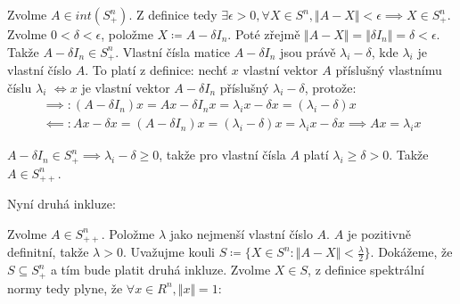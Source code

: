 \documentclass[12pt, a4paper]{article}
\begin{document}
Zvolme $A \in int(S^n_+)$. Z definice tedy  $\exists \epsilon > 0, \forall X \in S^n, \Vert A-X \Vert < \epsilon \implies X \in S^n_+$. Zvolme $0 < \delta < \epsilon$, položme $X \coloneqq  A - \delta I_n$. Poté zřejmě $\Vert A - X \Vert = \Vert \delta I_n \Vert = \delta < \epsilon$. Takže $A-\delta I_n \in S^n_+$. Vlastní čísla matice $A-\delta I_n$ jsou právě $\lambda_i - \delta$, kde $\lambda_i$ je vlastní číslo $A$. To platí z definice: nechť $x$ vlastní vektor $A$ příslušný vlastnímu číslu $\lambda_i$ $\iff x$ je vlastní vektor $A-\delta I_n$ příslušný $\lambda_i - \delta$, protože:
\begin{gather*}
\implies: (A-\delta I_n)x = Ax - \delta I_n x = \lambda_i x - \delta x = (\lambda_i -\delta) x\\
\impliedby: Ax - \delta x = (A-\delta I_n)x = (\lambda_i - \delta)x = \lambda_i x - \delta x \implies Ax = \lambda_i x
\end{gather*}

$A-\delta I_n \in S^n_+ \implies \lambda_i-\delta \geq 0$, takže pro vlastní čísla $A$ platí $\lambda_i \geq \delta > 0$. Takže $A \in S^n_{++}$.

Nyní druhá inkluze:

Zvolme $A \in S^n_{++}$. Položme $\lambda$ jako nejmenší vlastní číslo $A$. $A$ je pozitivně definitní, takže $\lambda > 0$. Uvažujme kouli $S \coloneqq \{ X \in S^n: \Vert A-X \Vert < \frac{\lambda}{2}\}$. Dokážeme, že $S \subseteq S^n_+$ a tím bude platit druhá inkluze. Zvolme $X \in S$, z definice spektrální normy tedy plyne, že $\forall x \in R^n, \Vert x \Vert = 1: $
\end{document}
